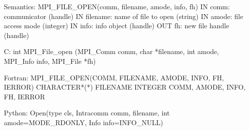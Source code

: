 Semantics:
MPI_FILE_OPEN(comm, filename, amode, info, fh)
IN comm: communicator (handle)
IN filename: name of file to open (string)
IN amode: file access mode (integer)
IN info: info object (handle)
OUT fh: new file handle (handle)

C:
int MPI_File_open
    (MPI_Comm comm, char *filename, int amode,
     MPI_Info info, MPI_File *fh)

Fortran:
MPI_FILE_OPEN(COMM, FILENAME, AMODE, INFO, FH, IERROR)
CHARACTER*(*) FILENAME
INTEGER COMM, AMODE, INFO, FH, IERROR

Python:
Open(type cls, Intracomm comm, filename,
     int amode=MODE_RDONLY, Info info=INFO_NULL)
